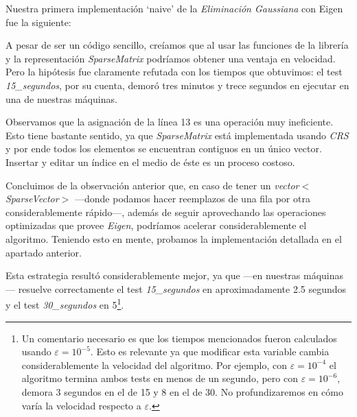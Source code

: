 \vspace{1em}
Nuestra primera implementación `naive' de la \textit{Eliminación Gaussiana} con Eigen fue la siguiente:

\vspace{1em}


\vspace{1em}
A pesar de ser un código sencillo, creíamos que al usar las funciones de la librería y la representación \textit{SparseMatrix} podríamos obtener una ventaja en velocidad. Pero la hipótesis fue claramente refutada con los tiempos que obtuvimos: el test \textit{15\_segundos}, por su cuenta, demoró tres minutos y trece segundos en ejecutar en una de nuestras máquinas.

\vspace{1em}
Observamos que la asignación de la línea 13 es una operación muy ineficiente. Esto tiene bastante sentido, ya que \textit{SparseMatrix} está implementada usando \textit{CRS} y por ende todos los elementos se encuentran contiguos en un único vector. Insertar y editar un índice en el medio de éste es un proceso costoso.
 
\vspace{1em}
Concluimos de la observación anterior que, en caso de tener un \textit{vector$<$SparseVector$>$} ---donde podamos hacer reemplazos de una fila por otra considerablemente rápido---, además de seguir aprovechando las operaciones optimizadas que provee \textit{Eigen}, podríamos acelerar considerablemente el algoritmo. Teniendo esto en mente, probamos la implementación detallada en el apartado anterior.

Esta estrategia resultó considerablemente mejor, ya que ---en nuestras máquinas--- resuelve correctamente el test \textit{15\_segundos} en aproximadamente 2.5 segundos y el test \textit{30\_segundos} en 5\footnote{Un comentario necesario es que los tiempos mencionados fueron calculados usando $\varepsilon = 10^{-5}$. Esto es relevante ya que modificar esta variable cambia considerablemente la velocidad del algoritmo. Por ejemplo, con $\varepsilon = 10^{-4}$ el algoritmo termina ambos tests en menos de un segundo, pero con $\varepsilon = 10^{-6}$, demora 3 segundos en el de 15 y 8 en el de 30. No profundizaremos en cómo varía la velocidad respecto a $\varepsilon$.
}.


